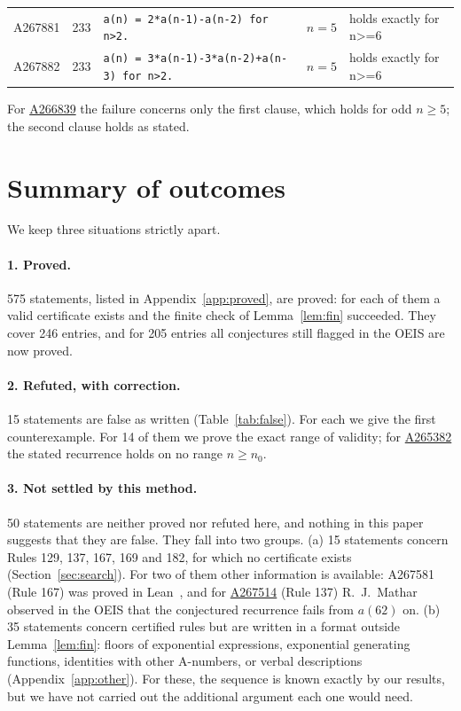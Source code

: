 \documentclass[11pt]{article}
\theoremstyle{definition}
\theoremstyle{remark}
\newcommand{\oeis}[1]{\href{https://oeis.org/#1}{#1}}
\begin{document}
\begin{longtable}{p{1.4cm}p{0.8cm}p{6.3cm}p{1.4cm}p{4cm}}
A267881 & 233 & \texttt{a(n)\allowbreak{} \allowbreak{}=\allowbreak{} \allowbreak{}2*\allowbreak{}a(n-\allowbreak{}1)\allowbreak{}-\allowbreak{}a(n-\allowbreak{}2)\allowbreak{} \allowbreak{}for \allowbreak{}n>2.} & $n=5$ & holds exactly for n>=6 \\
A267882 & 233 & \texttt{a(n)\allowbreak{} \allowbreak{}=\allowbreak{} \allowbreak{}3*\allowbreak{}a(n-\allowbreak{}1)\allowbreak{}-\allowbreak{}3*\allowbreak{}a(n-\allowbreak{}2)\allowbreak{}+\allowbreak{}a(n-\allowbreak{}3)\allowbreak{} \allowbreak{}for \allowbreak{}n>2.} & $n=5$ & holds exactly for n>=6 \\
\bottomrule
\end{longtable}
For \oeis{A266839} the failure concerns only the first clause, which holds for odd $n\ge5$; the second clause holds as stated.

\section{Summary of outcomes}\label{sec:outcomes}

We keep three situations strictly apart.

\paragraph{1. Proved.} 575 statements, listed in Appendix~\ref{app:proved}, are proved: for each of them a valid certificate exists and the finite check of Lemma~\ref{lem:fin} succeeded. They cover 246 entries, and for 205 entries all conjectures still flagged in the OEIS are now proved.

\paragraph{2. Refuted, with correction.} 15 statements are false as written (Table~\ref{tab:false}). For each we give the first counterexample. For 14 of them we prove the exact range of validity; for \oeis{A265382} the stated recurrence holds on no range $n\ge n_0$.

\paragraph{3. Not settled by this method.} 50 statements are neither proved nor refuted here, and nothing in this paper suggests that they are false. They fall into two groups. (a) 15 statements concern Rules 129, 137, 167, 169 and 182, for which no certificate exists (Section~\ref{sec:search}). For two of them other information is available: A267581 (Rule 167) was proved in Lean~\cite{adamczewski}, and for \oeis{A267514} (Rule 137) R.~J.~Mathar observed in the OEIS that the conjectured recurrence fails from $a(62)$ on. (b) 35 statements concern certified rules but are written in a format outside Lemma~\ref{lem:fin}: floors of exponential expressions, exponential generating functions, identities with other A-numbers, or verbal descriptions (Appendix~\ref{app:other}). For these, the sequence is known exactly by our results, but we have not carried out the additional argument each one would need.
\end{document}
